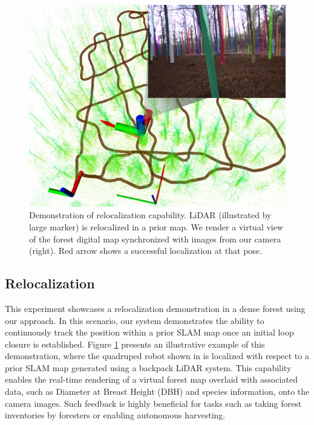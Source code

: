 \begin{figure}[t]
  \centering
  \includegraphics[width=0.99\linewidth]{pics/relocalization_demo.png}
  \caption{Demonstration of relocalization capability. LiDAR (illustrated by large marker) is relocalized in a prior map. We render a virtual view of the forest digital map synchronized with images from our camera (right). Red arrow shows a successful localization at that pose.
  }
  \label{fig:relocalization}
\end{figure}

\subsection{Relocalization} 
\label{sec:exp_relocalization}
This experiment showcases a relocalization demonstration in a dense forest using our approach. In this scenario, our system demonstrates the ability to continuously track the position within a prior SLAM map once an initial loop closure is established.
Figure \ref{fig:relocalization} presents an illustrative example of this demonstration, where the quadruped robot shown in  is localized with respect to a prior SLAM map generated using a backpack LiDAR system. This capability enables the real-time rendering of a virtual forest map overlaid with associated data, such as Diameter at Breast Height (DBH) and species information, onto the camera images. Such feedback is highly beneficial for tasks such as taking forest inventories by foresters or enabling autonomous harvesting.

